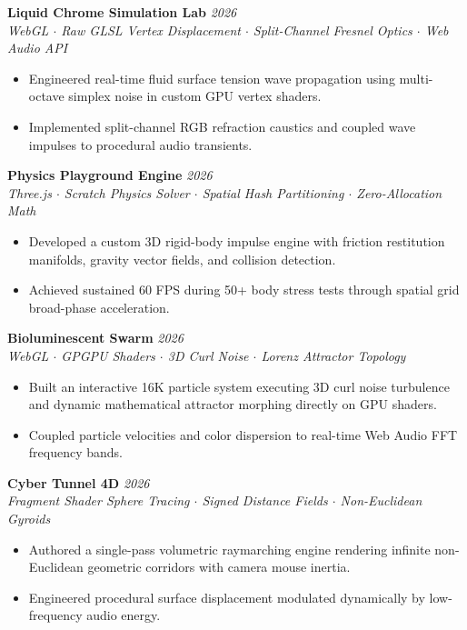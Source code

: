 \documentclass[10pt,a4paper]{article}
\begin{document}
\textbf{Liquid Chrome Simulation Lab} \hfill \textit{2026} \\
\textit{WebGL $\cdot$ Raw GLSL Vertex Displacement $\cdot$ Split-Channel Fresnel Optics $\cdot$ Web Audio API}
\begin{itemize}[leftmargin=12pt, itemsep=1pt]
    \item Engineered real-time fluid surface tension wave propagation using multi-octave simplex noise in custom GPU vertex shaders.
    \item Implemented split-channel RGB refraction caustics and coupled wave impulses to procedural audio transients.
\end{itemize}

\textbf{Physics Playground Engine} \hfill \textit{2026} \\
\textit{Three.js $\cdot$ Scratch Physics Solver $\cdot$ Spatial Hash Partitioning $\cdot$ Zero-Allocation Math}
\begin{itemize}[leftmargin=12pt, itemsep=1pt]
    \item Developed a custom 3D rigid-body impulse engine with friction restitution manifolds, gravity vector fields, and collision detection.
    \item Achieved sustained 60 FPS during 50+ body stress tests through spatial grid broad-phase acceleration.
\end{itemize}

\textbf{Bioluminescent Swarm} \hfill \textit{2026} \\
\textit{WebGL $\cdot$ GPGPU Shaders $\cdot$ 3D Curl Noise $\cdot$ Lorenz Attractor Topology}
\begin{itemize}[leftmargin=12pt, itemsep=1pt]
    \item Built an interactive 16K particle system executing 3D curl noise turbulence and dynamic mathematical attractor morphing directly on GPU shaders.
    \item Coupled particle velocities and color dispersion to real-time Web Audio FFT frequency bands.
\end{itemize}

\textbf{Cyber Tunnel 4D} \hfill \textit{2026} \\
\textit{Fragment Shader Sphere Tracing $\cdot$ Signed Distance Fields $\cdot$ Non-Euclidean Gyroids}
\begin{itemize}[leftmargin=12pt, itemsep=1pt]
    \item Authored a single-pass volumetric raymarching engine rendering infinite non-Euclidean geometric corridors with camera mouse inertia.
    \item Engineered procedural surface displacement modulated dynamically by low-frequency audio energy.
\end{itemize}
\end{document}
